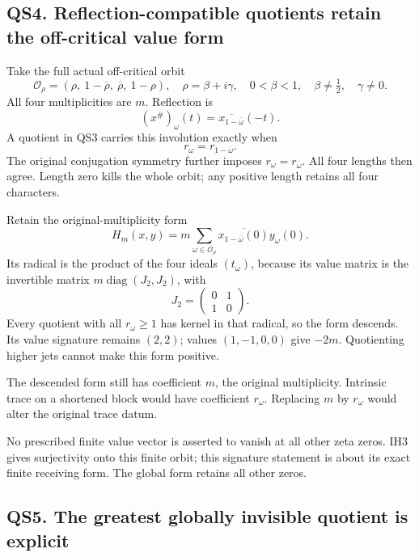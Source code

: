 \subsection{QS4. Reflection-compatible quotients retain the off-critical
value
form}\label{qs4.-reflection-compatible-quotients-retain-the-off-critical-value-form}

Take the full actual off-critical orbit \[
\mathcal O_\rho=(\rho,\ 1-\overline\rho,\ \overline\rho,\ 1-\rho),
\quad \rho=\beta+i\gamma,\quad0<\beta<1,\quad
\beta\ne\tfrac12,\quad\gamma\ne0.
\] All four multiplicities are \(m\). Reflection is \[
(x^\#)_\omega(t)=\overline{x_{1-\overline\omega}}(-t).
\tag{QS4.1}
\] A quotient in QS3 carries this involution exactly when \[
r_\omega=r_{1-\overline\omega}.
\tag{QS4.2}
\] The original conjugation symmetry further imposes
\(r_\omega=r_{\overline\omega}\). All four lengths then agree. Length
zero kills the whole orbit; any positive length retains all four
characters.

Retain the original-multiplicity form \[
H_m(x,y)=m\sum_{\omega\in\mathcal O_\rho}
\overline{x_{1-\overline\omega}(0)}y_\omega(0).
\tag{QS4.3}
\] Its radical is the product of the four ideals \((t_\omega)\), because
its value matrix is the invertible matrix
\(m\operatorname{diag}(J_2,J_2)\), with \[
J_2=\begin{pmatrix}0&1\\1&0\end{pmatrix}.
\] Every quotient with all \(r_\omega\ge1\) has kernel in that radical,
so the form descends. Its value signature remains \((2,2)\); values
\((1,-1,0,0)\) give \(-2m\). Quotienting higher jets cannot make this
form positive.

The descended form still has coefficient \(m\), the original
multiplicity. Intrinsic trace on a shortened block would have
coefficient \(r_\omega\). Replacing \(m\) by \(r_\omega\) would alter
the original trace datum.

No prescribed finite value vector is asserted to vanish at all other
zeta zeros. IH3 gives surjectivity onto this finite orbit; this
signature statement is about its exact finite receiving form. The global
form retains all other zeros.

\subsection{QS5. The greatest globally invisible quotient is
explicit}\label{qs5.-the-greatest-globally-invisible-quotient-is-explicit}

